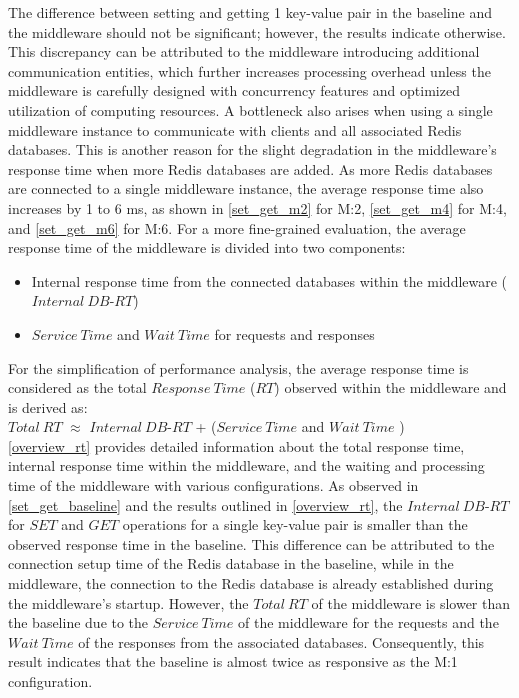 \noindent The difference between setting and getting 1 key-value pair in the baseline and the middleware should not be significant; however, the results indicate otherwise. This discrepancy can be attributed to the middleware introducing additional communication entities, which further increases processing overhead unless the middleware is carefully designed with concurrency features and optimized utilization of computing resources. A bottleneck also arises when using a single middleware instance to communicate with clients and all associated Redis databases. This is another reason for the slight degradation in the middleware's response time when more Redis databases are added. As more Redis databases are connected to a single middleware instance, the average response time also increases by 1 to 6 ms, as shown in \cref{set_get_m2} for M:2, \cref{set_get_m4} for M:4, and \cref{set_get_m6} for M:6. For a more fine-grained evaluation, the average response time of the middleware is divided into two components:
\begin{itemize}
\item[-]	Internal response time from the connected databases within the middleware ($Internal\:DB$-$RT$)
\item[-]	$Service\:Time$ and $Wait\:Time$ for requests and responses
\end{itemize}
For the simplification of performance analysis, the average response time is considered as the  total $Response\:Time$ ($RT$)  observed within the middleware and is derived as: \\

$Total\:RT$ $\approx$ $Internal\:DB$-$RT$ + ($Service\:Time$ and $Wait\:Time$ ) \\

\noindent \cref{overview_rt} provides detailed information about the total response time, internal response time within the middleware, and the waiting and processing time of the middleware with various configurations. As observed in \cref{set_get_baseline} and the results outlined in \cref{overview_rt}, the $Internal\:DB$-$RT$ for $SET$ and $GET$ operations for a single key-value pair is smaller than the observed response time in the baseline. This difference can be attributed to the connection setup time of the Redis database in the baseline, while in the middleware, the connection to the Redis database is already established during the middleware's startup. However, the $Total\:RT$ of the middleware is slower than the baseline due to the $Service\:Time$ of the middleware for the requests and the $Wait\:Time$ of the responses from the associated databases. Consequently, this result indicates that the baseline is almost twice as responsive as the M:1 configuration.

